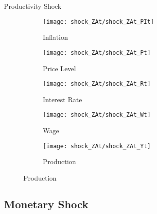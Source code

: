 \documentclass[../quali_slides.tex]{subfiles}
\begin{document}
\begin{frame}{Productivity Shock}
	
	\begin{figure}[h!]
		\centering
		\begin{subfigure}[b]{0.3\textwidth}
			\centering
			\texttt{[image: shock\_ZAt/shock\_ZAt\_PIt]}
			\caption{Inflation}
			\label{fig:zat-inflation}
		\end{subfigure}
		\hfill
		\begin{subfigure}[b]{0.3\textwidth}
			\centering
			\texttt{[image: shock\_ZAt/shock\_ZAt\_Pt]}
			\caption{Price Level}
			\label{fig:zat-price}
		\end{subfigure}
		\hfill
		\begin{subfigure}[b]{0.3\textwidth}
			\centering
			\texttt{[image: shock\_ZAt/shock\_ZAt\_Rt]}
			\caption{Interest Rate}
			\label{fig:zat-interest-rate}
		\end{subfigure}
		\hfill
		
		\vspace*{0.5cm}
		
		\hfill
		\begin{subfigure}[b]{0.3\textwidth}
			\centering
			\texttt{[image: shock\_ZAt/shock\_ZAt\_Wt]}
			\caption{Wage}
			\label{fig:zat-wage}
		\end{subfigure}
		\hfill
		\begin{subfigure}[b]{0.3\textwidth}
			\centering
			\texttt{[image: shock\_ZAt/shock\_ZAt\_Yt]}
			\caption{Production}
			\label{fig:zat-production}
		\end{subfigure}
		\hfill
		\hfill
	\end{figure}
	
\end{frame}


\subsection{Monetary Shock}
\end{document}

